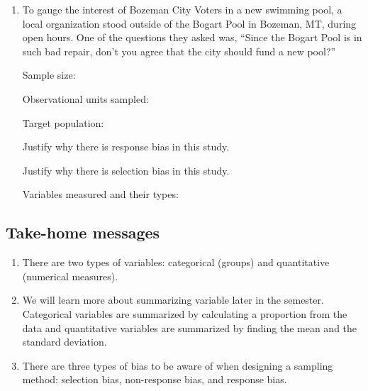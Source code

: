 \documentclass[
]{report}
\begin{document}
\vspace{0.5in}

\newpage

\begin{enumerate}
\def\labelenumi{\arabic{enumi}.}
\setcounter{enumi}{9}
\item
  To gauge the interest of Bozeman City Voters in a new swimming pool, a local organization stood outside of the Bogart Pool in Bozeman, MT, during open hours. One of the questions they asked was, ``Since the Bogart Pool is in such bad repair, don't you agree that the city should fund a new pool?''
  \vspace{0.1in}

  Sample size:
  \vspace{0.3in}

  Observational units sampled:
  \vspace{0.3in}

  Target population:
  \vspace{0.3in}

  Justify why there is response bias in this study.
  \vspace{0.5in}

  Justify why there is selection bias in this study.
  \vspace{0.5in}

  Variables measured and their types:
\end{enumerate}

\vspace{0.5in}

\subsection{Take-home messages}\label{take-home-messages-1}

\begin{enumerate}
\def\labelenumi{\arabic{enumi}.}
\item
  There are two types of variables: categorical (groups) and quantitative (numerical measures).
\item
  We will learn more about summarizing variable later in the semester. Categorical variables are summarized by calculating a proportion from the data and quantitative variables are summarized by finding the mean and the standard deviation.
\item
  There are three types of bias to be aware of when designing a sampling method: selection bias, non-response bias, and response bias.
\end{enumerate}
\end{document}

